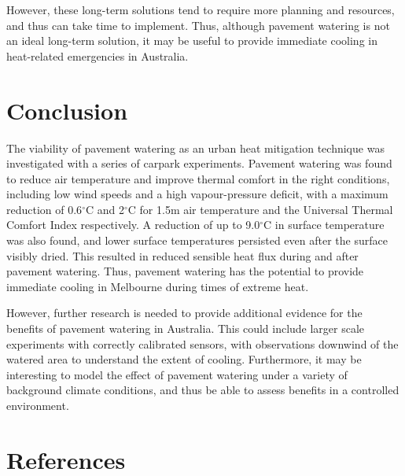 \documentclass[final,3p,times,authoryear]{elsarticle}
\begin{document}
However, these long-term solutions tend to require more planning and resources, and thus can take time to implement. Thus, although pavement watering is not an ideal long-term solution, it may be useful to provide immediate cooling in heat-related emergencies in Australia.

\section{Conclusion}\label{sec:conclusion}

The viability of pavement watering as an urban heat mitigation technique was investigated with a series of carpark experiments. Pavement watering was found to reduce air temperature and improve thermal comfort in the right conditions, including low wind speeds and a high vapour-pressure deficit, with a maximum reduction of 0.6$^{\circ}$C and 2$^{\circ}$C for 1.5m air temperature and the Universal Thermal Comfort Index respectively. A reduction of up to 9.0$^{\circ}$C in surface temperature was also found, and lower surface temperatures persisted even after the surface visibly dried. This resulted in reduced sensible heat flux during and after pavement watering. Thus, pavement watering has the potential to provide immediate cooling in Melbourne during times of extreme heat.

However, further research is needed to provide additional evidence for the benefits of pavement watering in Australia. This could include larger scale experiments with correctly calibrated sensors, with observations downwind of the watered area to understand the extent of cooling. Furthermore, it may be interesting to model the effect of pavement watering under a variety of background climate conditions, and thus be able to assess benefits in a controlled environment.



\printglossaries

\section{References}\label{sec:ref}
 

\end{document}
